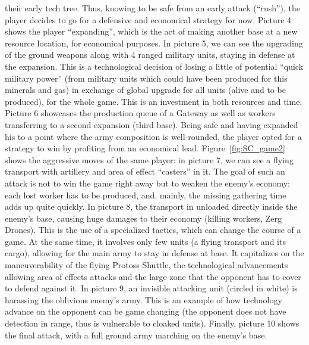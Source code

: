 their early tech tree. Thus, knowing to be safe from an early attack (``rush''), the player decides to go for a defensive and economical strategy for now. Picture 4 shows the player ``expanding'', which is the act of making another base at a new resource location, for economical purposes. In picture 5, we can see the upgrading of the ground weapons along with 4 ranged military units, staying in defense at the expansion. This is a technological decision of losing a little of potential ``quick military power'' (from military units which could have been produced for this minerals and gas) in exchange of global upgrade for all units (alive and to be produced), for the whole game. This is an investment in both resources and time. Picture 6 showcases the production queue of a Gateway as well as workers transferring to a second expansion (third base). Being safe and having expanded his  to a point where the army composition is well-rounded, the player opted for a strategy to win by profiting from an economical lead. Figure~\ref{fig:SC_game2} shows the aggressive moves of the same player: in picture 7, we can see a flying transport with artillery and area of effect ``casters'' in it. The goal of such an attack is not to win the game right away but to weaken the enemy's economy: each lost worker has to be produced, and, mainly, the missing gathering time adds up quite quickly. In picture 8, the transport in unloaded directly inside the enemy's base, causing huge damages to their economy (killing workers, Zerg Drones). This is the use of a specialized tactics, which can change the course of a game. At the same time, it involves only few units (a flying transport and its cargo), allowing for the main army to stay in defense at base. It capitalizes on the maneuverability of the flying Protoss Shuttle, the technological advancements allowing area of effects attacks and the large zone that the opponent has to cover to defend against it. In picture 9, an invisible attacking unit (circled in white) is harassing the oblivious enemy's army. This is an example of how technology advance on the opponent can be game changing (the opponent does not have detection in range, thus is vulnerable to cloaked units). Finally, picture 10 shows the final attack, with a full ground army marching on the enemy's base.


